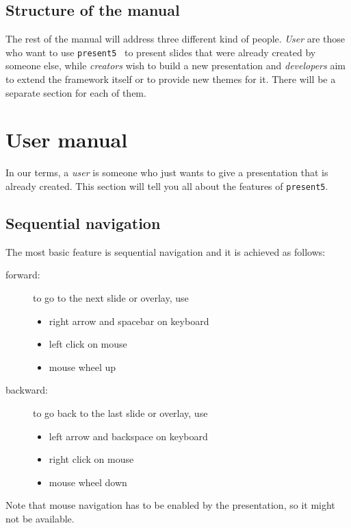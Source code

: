 \documentclass{scrartcl}
\newcommand{\present}{\code{present5}}
\newcommand{\code}[1]{{\tt #1}}
\begin{document}
\subsection{Structure of the manual}
\label{subsection:structureOfTheManual}

The rest of the manual will address three different kind of people. \emph{User} are those who want to use \present~ to present slides that were already created by someone else, while \emph{creators} wish to build a new presentation and \emph{developers} aim to extend the framework itself or to provide new themes for it. There will be a separate section for each of them.




\section{User manual}
\label{sec:userManual}


In our terms, a \emph{user} is someone who just wants to give a presentation that is already created. This section will tell you all about the features of \present.

\subsection{Sequential navigation}
\label{subsection:sequentialNavigation}

The most basic feature is sequential navigation and it is achieved as follows:
\begin{description}
\item[forward:] to go to the next slide or overlay, use
  \begin{itemize}
  \item right arrow and spacebar on keyboard
  \item left click on mouse
  \item mouse wheel up
  \end{itemize}
\item[backward:] to go back to the last slide or overlay, use
  \begin{itemize}
  \item left arrow and backspace on keyboard
  \item right click on mouse
  \item mouse wheel down
  \end{itemize}
\end{description}
Note that mouse navigation has to be enabled by the presentation, so it might not be available. 
\end{document}
